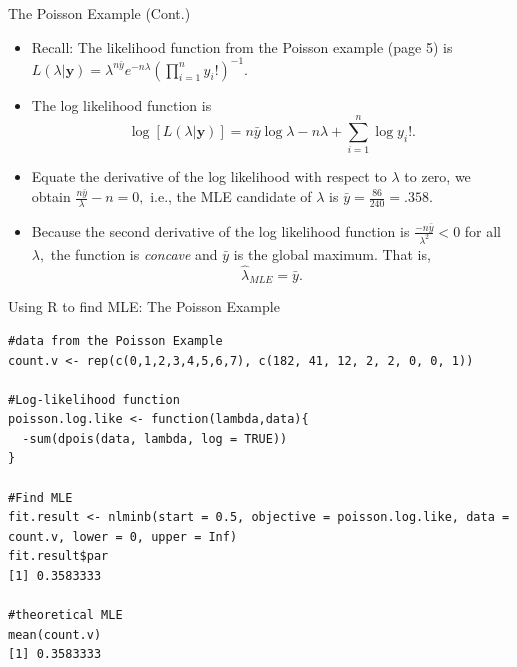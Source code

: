\documentclass{beamer}
\begin{document}
            \begin{frame}{The Poisson Example (Cont.)}
        \begin{itemize}
            \item Recall: The likelihood function from the Poisson example (page 5) is 
$L(\lambda|\boldsymbol{y}) = \lambda^{n\bar{y}}e^{-n\lambda}\left( \prod^{n}_{i=1} y_{i}!   \right)^{-1}.$
             \item The log likelihood function is $$\log\left[L(\lambda| \boldsymbol{y})\right] = n\bar{y}\log{\lambda} - n\lambda + \sum^{n}_{i=1}\log y_{i}!.$$
             \item Equate the derivative of the log likelihood with respect to $\lambda$ to zero, we obtain $\frac{n\bar{y}}{\lambda} - n = 0,$ i.e., the MLE candidate of $\lambda$ is $\bar{y} = \frac{86}{240} = .358$.
             \item Because the second derivative of the log likelihood function is $\frac{-n\bar{y}}{\lambda^{2}} < 0$ for all $\lambda,$ the function is {\it concave} and $\bar{y}$ is the global maximum. That is, $$\hat{\lambda}_{MLE} = \bar{y}.$$ 
        \end{itemize}
    \end{frame}


\begin{frame}[fragile]{Using R to find MLE: The Poisson Example}

\begin{lstlisting}
#data from the Poisson Example
count.v <- rep(c(0,1,2,3,4,5,6,7), c(182, 41, 12, 2, 2, 0, 0, 1)) 

#Log-likelihood function
poisson.log.like <- function(lambda,data){
  -sum(dpois(data, lambda, log = TRUE))
}

#Find MLE
fit.result <- nlminb(start = 0.5, objective = poisson.log.like, data = count.v, lower = 0, upper = Inf)
fit.result$par   
[1] 0.3583333

#theoretical MLE
mean(count.v) 
[1] 0.3583333
\end{lstlisting}
\end{frame}
\end{document}
